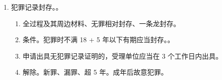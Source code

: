 \begin{enumerate}
\begin{enumerate}
          \item 被告人。
                \begin{enumerate}
                  \item 认罪认罚有异议，可以不签具结书，不影响适用。。
                  \item 再犯罪接受调查时，应当主动如实供述犯罪记录。
                  \item 有权拒绝辩护并要求更换辩护人。
                \end{enumerate}
          \item 法定代理人。最后陈述阶段，可以、做补充陈述。。
        \end{enumerate}
  \item 犯罪记录封存。。
        \begin{enumerate}
          \item 全过程及其周边材料、无罪相对封存、一条龙封存。
          \item 条件。犯罪时不满 18 + 5 年以下有期应当封存。。
          \item 申请出具无犯罪记录证明的，受理单位应当在 3 个工作日内出具。
          \item 解除。新罪、漏罪、超 5 年。成年后故意犯罪。
        \end{enumerate}
\end{enumerate}
